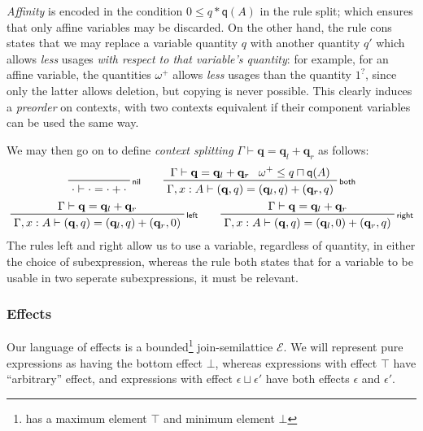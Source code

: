 \documentclass[acmsmall,screen,review]{acmart}
\newcommand{\mc}[1]{\ensuremath{\mathcal{#1}}}
\newcommand{\mb}[1]{\ensuremath{\mathbf{#1}}}
\newcommand{\ms}[1]{\ensuremath{\mathsf{#1}}}
\newcommand{\qsp}[4]{#1 \vdash #2 = #3 + #4}
\newcommand{\rle}[1]{{\scriptsize\textsf{#1}}}
\newcommand{\brle}[1]{{\textsf{#1}}}
\newcommand{\zeroq}{0}
\newcommand{\delq}{1^?}
\newcommand{\cpyq}{\omega^+}
\newcommand{\alquant}{\ms{q}}
\begin{document}
\emph{Affinity} is encoded in the condition $\zeroq \leq q * \alquant(A)$ in the rule \brle{split};
which ensures that only affine variables may be discarded. On the other hand, the rule \brle{cons}
states that we may replace a variable quantity $q$ with another quantity $q'$ which allows
\emph{less} usages \emph{with respect to that variable's quantity}: for example, for an affine
variable, the quantities $\cpyq$ allows \emph{less} usages than the quantity $\delq$, since only the
latter allows deletion, but copying is never possible. This clearly induces a \emph{preorder} on
contexts, with two contexts equivalent if their component variables can be used the same way.

We may then go on to define \emph{context splitting} $\qsp{\Gamma}{\mb{q}}{\mb{q}_l}{\mb{q}_r}$ as
follows:
\begin{gather*}
  \prftree[r]{\rle{nil}}
    {\qsp{\cdot}{\cdot}{\cdot}{\cdot}} \qquad
  \prftree[r]{\rle{both}}
    {\qsp{\Gamma}{\mb{q}}{\mb{q}_l}{\mb{q}_r}}
    {\cpyq \leq q \sqcap \alquant(A)}
    {\qsp{\Gamma, x : A}{(\mb{q}, q)}{(\mb{q}_l, q)}{(\mb{q}_r, q)}}
    \\
  \prftree[r]{\rle{left}}
    {\qsp{\Gamma}{\mb{q}}{\mb{q}_l}{\mb{q}_r}}
    {\qsp{\Gamma, x : A}{(\mb{q}, q)}{(\mb{q}_l, q)}{(\mb{q}_r, \zeroq)}} \qquad
  \prftree[r]{\rle{right}}
    {\qsp{\Gamma}{\mb{q}}{\mb{q}_l}{\mb{q}_r}}
    {\qsp{\Gamma, x : A}{(\mb{q}, q)}{(\mb{q}_l, \zeroq)}{(\mb{q}_r, q)}}
\end{gather*}
The rules \brle{left} and \brle{right} allow us to use a variable, regardless of quantity, in either
the choice of subexpression, whereas the rule \brle{both} states that for a variable to be usable in
two seperate subexpressions, it must be relevant.

\subsubsection{Effects}
Our language of effects is a bounded\footnote{has a maximum element $\top$ and minimum element
$\bot$} join-semilattice $\mc{E}$. We will represent pure expressions as having the bottom effect
$\bot$, whereas expressions with effect $\top$ have ``arbitrary'' effect, and expressions with
effect $\epsilon \sqcup \epsilon'$ have both effects $\epsilon$ and $\epsilon'$.
\end{document}
